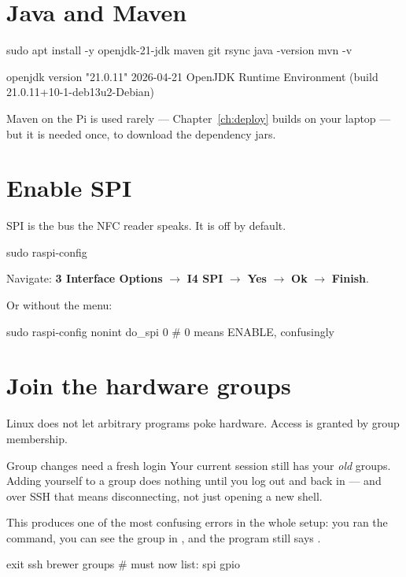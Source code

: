 \section{Java and Maven}

\begin{shell}
sudo apt install -y openjdk-21-jdk maven git rsync
java -version
mvn -v
\end{shell}

\begin{trace}
openjdk version "21.0.11" 2026-04-21
OpenJDK Runtime Environment (build 21.0.11+10-1-deb13u2-Debian)
\end{trace}

Maven on the Pi is used rarely --- Chapter~\ref{ch:deploy} builds on your laptop
--- but it is needed once, to download the dependency jars.

\section{Enable SPI}

SPI is the bus the NFC reader speaks. It is off by default.

\begin{shell}
sudo raspi-config
\end{shell}

Navigate: \textbf{3 Interface Options} $\rightarrow$ \textbf{I4 SPI}
$\rightarrow$ \textbf{Yes} $\rightarrow$ \textbf{Ok} $\rightarrow$
\textbf{Finish}.

Or without the menu:

\begin{shell}
sudo raspi-config nonint do_spi 0      # 0 means ENABLE, confusingly
\end{shell}

\section{Join the hardware groups}

Linux does not let arbitrary programs poke hardware. Access is granted by group
membership.


\begin{trap}{Group changes need a fresh login}
Your current session still has your \emph{old} groups. Adding yourself to a group
does nothing until you log out and back in --- and over SSH that means
disconnecting, not just opening a new shell.

This produces one of the most confusing errors in the whole setup: you ran the
command, you can see the group in , and the program still says
.

\begin{shell}
exit
ssh brewer
groups          # must now list: spi gpio
\end{shell}
\end{trap}

